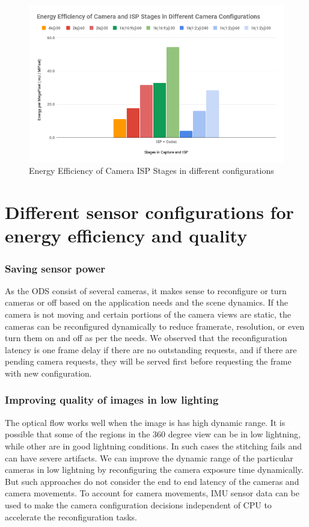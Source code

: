 \begin{figure}
	\begin{center}
		\includegraphics[width=1\textwidth]{data/images/EnergyEfficiencyofCameraandISPStagesinDifferentCameraConfigurations}
		\caption{Energy Efficiency of Camera ISP Stages in different configurations}
		\label{fig:ex_4_9}
	\end{center}
\end{figure} 



\section{Different sensor configurations for energy efficiency and quality}
\subsubsection{Saving sensor power}
As the ODS consist of several cameras, it makes sense to reconfigure or turn cameras or off based on the application needs and the scene dynamics. If the camera is not moving and certain portions of the camera views are static, the cameras can be reconfigured dynamically to reduce framerate, resolution, or even turn them on and off as per the needs. We observed that the reconfiguration latency is one frame delay if there are no outstanding requests, and if there are pending camera requests, they will be served first before requesting the frame with new configuration. 
\subsubsection{Improving quality of images in low lighting}
The optical flow works well when the image is has high dynamic range. It is possible that some of the regions in the 360 degree view can be in low lightning, while other are in good lightning conditions. In such cases the stitching fails and can have severe artifacts. We can improve the dynamic range of the particular cameras in low lightning by reconfiguring the camera exposure time dynamically. But such approaches do not consider the end to end latency of the cameras and camera movements. To account for camera movements, IMU sensor data can be used to make the camera configuration decisions independent of CPU to accelerate the reconfiguration tasks. 

